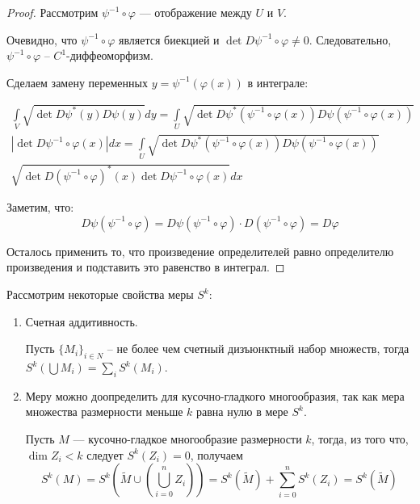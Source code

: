\documentclass[a5paper]{article}
\theoremstyle{plain}
\theoremstyle{definition}
\numberwithin{through}{section}
\numberwithin{equation}{section}
\begin{document}
\begin{proof}
	Рассмотрим $\psi^{-1} \circ \varphi$ --- отображение между $U$ и $V$.
	
	Очевидно, что $\psi^{-1} \circ \varphi$ является биекцией и $\det D \psi^{-1} \circ \varphi \not= 0$. Следовательно, $\psi^{-1} \circ \varphi$ -- $C^1$-диффеоморфизм.
	
	Сделаем замену переменных $y = \psi^{-1} (\varphi (x))$ в интеграле:
	
	\begin{multline*}
		\int\limits_{V} \sqrt{\det D \psi^* (y) D \psi (y)} dy = 
		\int\limits_{U} \sqrt{\det D \psi^* (\psi^{-1} \circ \varphi (x)) D \psi (\psi^{-1} \circ \varphi (x)) } \\ 
		|\det D \psi^{-1} \circ \varphi (x)|dx = \int\limits_{U} \sqrt{\det D \psi^* (\psi^{-1} \circ \varphi (x)) D \psi (\psi^{-1} \circ \varphi (x)) } \\ \sqrt{\det D (\psi^{-1} \circ \varphi)^* (x) \det D \psi^{-1} \circ \varphi (x)} dx
	\end{multline*}
	
	Заметим, что: 
	\begin{equation*}
		D \psi(\psi^{-1} \circ \varphi) = D \psi (\psi^{-1} \circ \varphi) \cdot D (\psi^{-1} \circ \varphi) = D \varphi
	\end{equation*}
	
	
	Осталось применить то, что произведение определителей равно определителю произведения и подставить это равенство в интеграл.
\end{proof}

Рассмотрим некоторые свойства меры $S^k$:

\begin{enumerate}
	\item Счетная аддитивность. 
	
	Пусть $\{M_i\}_{i \in N}$ -- не более чем счетный дизъюнктный набор множеств, тогда $S^k(\bigcup M_i) = \sum\limits_{i} S^k(M_i)$.
	
	\item Меру можно доопределить для кусочно-гладкого многообразия, так как мера множества размерности меньше $k$ равна нулю в мере $S^k$.
	
	Пусть $M$ --- кусочно-гладкое многообразие размерности $k$, тогда, из того что, $\dim Z_i < k$ следует $S^k(Z_i) = 0$, получаем
	\begin{equation*}
		S^k(M) = S^k(\tilde{M} \cup (\bigcup_{i=0}^{n} Z_i)) = S^k(\tilde{M}) + \sum\limits_{i = 0}^{n} S^k(Z_i) = S^k(\tilde{M})
	\end{equation*}	
\end{enumerate}
\end{document}
